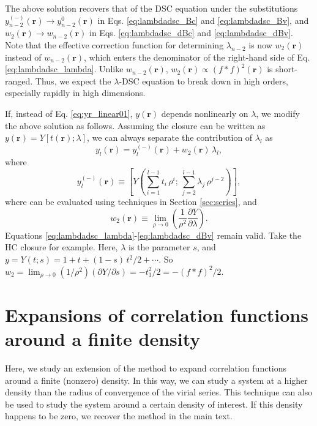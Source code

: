 \documentclass[aip,jcp,preprint,superscriptaddress,showpacs,preprintnumbers,amsmath,amssymb]{revtex4-1}
\numberwithin{equation}{section}
\newcommand{\vct}[1]{\mathbf{#1}}
\providecommand{\vr}{} %
\renewcommand{\vr}{\vct{r}}
\begin{document}
The above solution recovers that of the DSC equation
under the substitutions
$y_{n-2}^{(-)}(\vr) \rightarrow y_{n-2}^0(\vr)$
in Eqs. \eqref{eq:lambdadsc_Bc} and \eqref{eq:lambdadsc_Bv},
and
$w_2(\vr) \rightarrow w_{n-2}(\vr)$
in Eqs. \eqref{eq:lambdadsc_dBc} and \eqref{eq:lambdadsc_dBv}.
%
Note that the effective correction function
for determining $\lambda_{n-2}$ is now $w_2(\vr)$
instead of $w_{n-2}(\vr)$,
which enters the denominator of
the right-hand side of Eq. \eqref{eq:lambdadsc_lambda}.
%
Unlike $w_{n-2}(\vr)$,
$w_2(\vr) \propto (f*f)^2(\vr)$ is short-ranged.
%
Thus,
we expect the $\lambda$-DSC equation
to break down in high orders,
especially rapidly in high dimensions.

If, instead of Eq. \eqref{eq:yr_linear01},
$y(\vr)$ depends nonlinearly on $\lambda$,
we modify the above solution as follows.
%
Assuming the closure can be written as
$y(\vr) = Y[t(\vr); \lambda]$,
we can always separate the contribution of $\lambda_l$ as
%
\begin{equation}
y_l(\vr)
=
y_l^{(-)}(\vr)
+
w_2(\vr) \, \lambda_l,
\end{equation}
%
where
%
\begin{equation}
y_l^{(-)}(\vr)
\equiv
\left[
  Y\left(
    \sum_{i=1}^{l-1} t_i \, \rho^i; \,
    \sum_{j=2}^{l-1} \lambda_j \, \rho^{j-2}
  \right)
\right],
\end{equation}
%
where can be evaluated using techniques
in Section \ref{sec:series}, and
%
\[
w_2(\vr) \equiv
\lim_{\rho \rightarrow 0}
\left(
  \frac{ 1 } { \rho^2 }
  \frac{ \partial Y } { \partial \lambda }
\right).
\]
%
Equations \eqref{eq:lambdadsc_lambda}-\eqref{eq:lambdadsc_dBv}
remain valid.
%
Take the HC closure\cite{
hutchinson1971, *hutchinson1972}
for example.
%
Here,
$\lambda$ is the parameter $s$,
and
$y = Y(t; s) = 1 + t + (1-s)\,t^2/2 + \cdots$.
%
So
$w_2 =
\lim_{\rho \rightarrow 0}
(1/\rho^2)(\partial Y/\partial s)
= - t_1^2 / 2 = -(f*f)^2/2$.





\section{\label{eq:dcorr}
Expansions of correlation functions around a finite density}





Here, we study an extension of the method
to expand correlation functions
around a finite (nonzero) density.
%
In this way,
we can study a system at a higher density than
the radius of convergence of the virial series.
%
This technique can also be used to study the system
around a certain density of interest.
%
If this density happens to be zero,
we recover the method in the main text.
\end{document}
